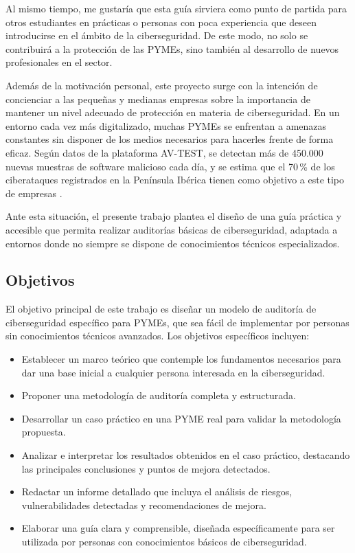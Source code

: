 \documentclass[a4paper, 11pt]{article}
\begin{document}
Al mismo tiempo, me gustaría que esta guía sirviera como punto de partida para otros estudiantes en prácticas o personas con poca experiencia que deseen introducirse en el ámbito de la ciberseguridad. De este modo, no solo se contribuirá a la protección de las PYMEs, sino también al desarrollo de nuevos profesionales en el sector.


Además de la motivación personal, este proyecto surge con la intención de concienciar a las pequeñas y medianas empresas sobre la importancia de mantener un nivel adecuado de protección en materia de ciberseguridad. En un entorno cada vez más digitalizado, muchas PYMEs se enfrentan a amenazas constantes sin disponer de los medios necesarios para hacerles frente de forma eficaz. Según datos de la plataforma AV-TEST, se detectan más de 450.000 nuevas muestras de software malicioso cada día, y se estima que el 70\,\% de los ciberataques registrados en la Península Ibérica tienen como objetivo a este tipo de empresas \cite{avtest}. 


Ante esta situación, el presente trabajo plantea el diseño de una guía práctica y accesible que permita realizar auditorías básicas de ciberseguridad, adaptada a entornos donde no siempre se dispone de conocimientos técnicos especializados.

\subsection{Objetivos}


El objetivo principal de este trabajo es diseñar un modelo de auditoría de ciberseguridad específico para PYMEs, que sea fácil de implementar por personas sin conocimientos técnicos avanzados. Los objetivos específicos incluyen:

\begin{itemize}
    \item Establecer un marco teórico que contemple los fundamentos necesarios para dar una base inicial a cualquier persona interesada en la ciberseguridad.
    \item Proponer una metodología de auditoría completa y estructurada.
    \item Desarrollar un caso práctico en una PYME real para validar la metodología propuesta.
    \item Analizar e interpretar los resultados obtenidos en el caso práctico, destacando las principales conclusiones y puntos de mejora detectados.

    \item Redactar un informe detallado que incluya el análisis de riesgos, vulnerabilidades detectadas y recomendaciones de mejora.
    \item Elaborar una guía clara y comprensible, diseñada específicamente para ser utilizada por personas con conocimientos básicos de ciberseguridad.
\end{itemize}
\end{document}
